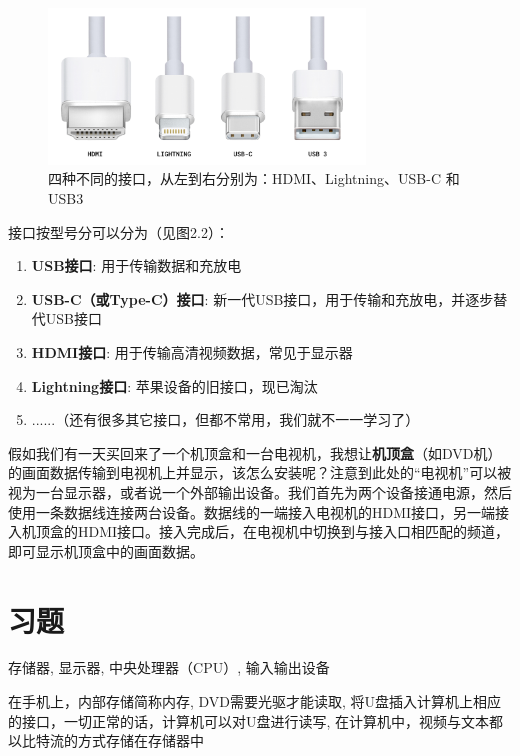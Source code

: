 \begin{figure}[htbp]
    \centering
    \includegraphics[width=0.75\textwidth]{images/ch2/four_interfaces}
    \caption{
        四种不同的接口，从左到右分别为：HDMI、Lightning、USB-C 和 USB3
    }
    \label{fig:cpu_four_interfaces}
\end{figure}

接口按型号分可以分为（见图2.2）：

\begin{enumerate}
    \item { \textbf{USB接口}: 用于传输数据和充放电 }
    \item { \textbf{USB-C（或Type-C）接口}: 新一代USB接口，用于传输和充放电，并逐步替代USB接口 }
    \item { \textbf{HDMI接口}: 用于传输高清视频数据，常见于显示器 }
    \item { \textbf{Lightning接口}: 苹果设备的旧接口，现已淘汰 }
    \item { ......（还有很多其它接口，但都不常用，我们就不一一学习了） }
\end{enumerate}

假如我们有一天买回来了一个机顶盒和一台电视机，我想让\textbf{机顶盒}（如DVD机）的画面数据传输到电视机上并显示，该怎么安装呢？注意到此处的“电视机”可以被视为一台显示器，或者说一个外部输出设备。我们首先为两个设备接通电源，然后使用一条数据线连接两台设备。数据线的一端接入电视机的HDMI接口，另一端接入机顶盒的HDMI接口。接入完成后，在电视机中切换到与接入口相匹配的频道，即可显示机顶盒中的画面数据。


\section{习题}\label{sec:arch:exercise}

 {
    存储器,
    显示器,
    中央处理器（CPU）,
    输入输出设备
}

 {
    在手机上，内部存储简称内存,
    DVD需要光驱才能读取,
    将U盘插入计算机上相应的接口，一切正常的话，计算机可以对U盘进行读写,
    在计算机中，视频与文本都以比特流的方式存储在存储器中
}

